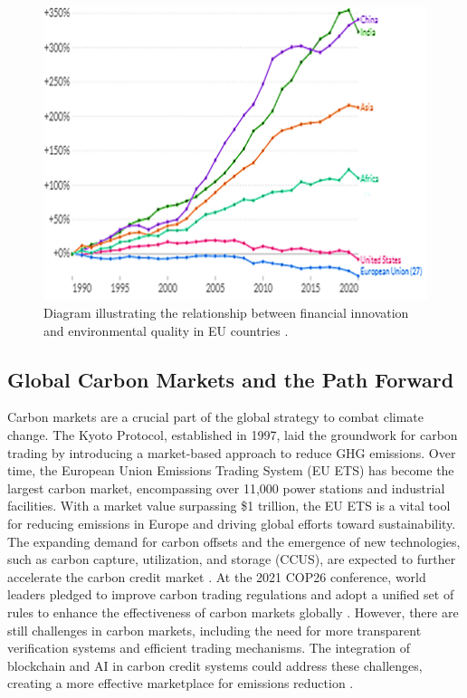 \documentclass[preprint,12pt]{elsarticle}
\begin{document}
\begin{figure}
    \centering
    \includegraphics[width=0.8\linewidth]{fig/fig1-1.png}
    \caption{Diagram illustrating the relationship between financial innovation and environmental quality in EU countries \citep{jamshidi2023financial}.}
    \label{fig:fig1-1}
\end{figure}

\subsection{Global Carbon Markets and the Path Forward}
Carbon markets are a crucial part of the global strategy to combat climate change. The Kyoto Protocol, established in 1997, laid the groundwork for carbon trading by introducing a market-based approach to reduce GHG emissions. Over time, the European Union Emissions Trading System (EU ETS) has become the largest carbon market, encompassing over 11,000 power stations and industrial facilities. With a market value surpassing \$1 trillion, the EU ETS is a vital tool for reducing emissions in Europe and driving global efforts toward sustainability. The expanding demand for carbon offsets and the emergence of new technologies, such as carbon capture, utilization, and storage (CCUS), are expected to further accelerate the carbon credit market . At the 2021 COP26 conference, world leaders pledged to improve carbon trading regulations and adopt a unified set of rules to enhance the effectiveness of carbon markets globally \citep{parhamfar2024towards}. However, there are still challenges in carbon markets, including the need for more transparent verification systems and efficient trading mechanisms. The integration of blockchain and AI in carbon credit systems could address these challenges, creating a more effective marketplace for emissions reduction .
\end{document}
